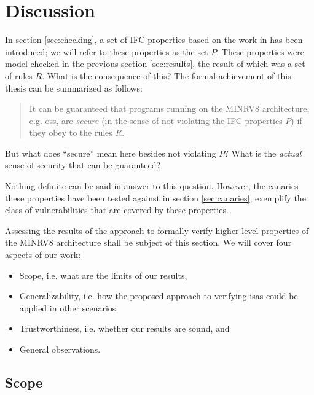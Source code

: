 
\section{Discussion}
\label{sec:discussion}

In section \ref{sec:checking}, a set of IFC properties based on the work in \cite{Ferraiuolo17} has been introduced; we will refer to these properties as the set $ P $.
These properties were model checked in the previous section \ref{sec:results}, the result of which was a set of rules $ R $.
What is the consequence of this?
The formal achievement of this thesis can be summarized as follows:
\begin{quote}
    It can be guaranteed that programs running on the MINRV8 architecture, e.g. \glspl{os}, are \textit{secure} (in the sense of not violating the IFC properties $ P $) if they obey to the rules $ R $.
\end{quote}
But what does \enquote{secure} mean here besides not violating $ P $?
What is the \textit{actual} sense of security that can be guaranteed?

Nothing definite can be said in answer to this question.
However, the canaries these properties have been tested against in section \ref{sec:canaries}, exemplify the class of vulnerabilities that are covered by these properties.

Assessing the results of the approach to formally verify higher level properties of the MINRV8 architecture shall be subject of this section.
We will cover four aspects of our work:
\begin{itemize}
    \item Scope, i.e. what are the limits of our results,
    \item Generalizability, i.e. how the proposed approach to verifying \glspl{isa} could be applied in other scenarios,
    \item Trustworthiness, i.e. whether our results are sound, and
    \item General observations.
\end{itemize}

\subsection{Scope}
\label{sec:scope}


